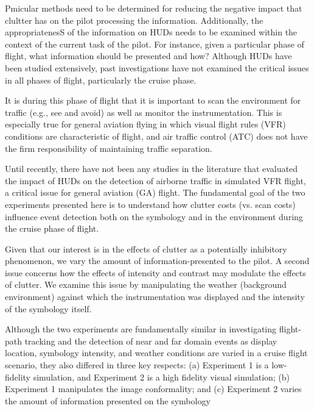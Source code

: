 \documentclass[utf8,bachelor,manualbib]{gradu3}
\begin{document}
Pmicular methods need to be determined for reducing the negative impact that clultter has on the pilot processing the information. Additionally, the appropriatenesS of the information on HUDs needs to be examined within the context of the current task of the pilot. For instance, given a particular phase of flight, what information should be presented and how? Although HUDs have been studied extensively, past investigations have not examined the critical issues in all phases of flight, particularly the cruise phase. 

It is during this phase of flight that it is important to scan the environment for traffic
(e.g., see and avoid) as well as monitor the instrumentation. This is especially true for general aviation flying in which visual flight rules (VFR) conditions are characteristic of flight, and air traffic control (ATC) does not have the firm responsibility of maintaining traffic separation.

Until recently, there have not been any studies in the literature that evaluated the impact of HUDs on the detection of airborne traffic in simulated VFR flight, a critical issue for general aviation (GA) flight. The fundamental goal of the two experiments presented here is to understand how clutter costs (vs. scan costs) influence event detection both on the symbology and in the environment during the cruise phase of flight.

Given that our interest is in the effects of clutter as a potentially inhibitory phenomenon, we vary the amount of information-presented to the pilot. A second issue concerns how the effects of intensity and contrast may modulate the effects of clutter. We examine this issue by manipulating the weather (background environment) against which the instrumentation was displayed and the intensity of the symbology itself.

Although the two experiments are fundamentally similar in investigating flight-path tracking and the detection of near and far domain events as display location, symbology intensity, and weather conditions are varied in a cruise flight scenario, they also differed in three key respects: (a) Experiment 1 is a low-fidelity simulation, and Experiment 2 is a high fidelity visual simulation; (b) Experiment 1 manipulates the image conformality; and (c) Experiment 2 varies the amount of information presented on the symbology \citep{ververs1998}
\end{document}
